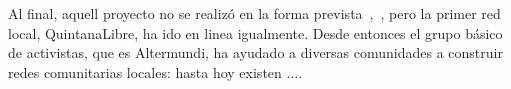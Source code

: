 \begin{comment}
2015
* talleres educativos con otros proyectos (cooperativa de mujeres en NIC?)
* Abr: LaBolsaLibre va en linea
* Dec: Macri llega al poder en Argentina --> política orientada hacia al mercado: laissez-faire capitalismo, los límites para lincencias cesan
  ** deroga el Artículo 82 de la Argentina Digital

reticulación (vernetzung)/intercambio de experiencias con otros proyectos internacionales
* Rhizomatica
* BattleMesh



2016
* principios: Macri modifica la Ley 26.522 con un decreto: " morigerar el carácter antimonopólico de la ley, beneficiando a los principales medios de comunicación del país. "
* FCC + EU: Firmware lockdown
* Nace el proyecto del Libre router
"This virtuous relation between hardware vendors and the community has been threatened by new regulation from the Federal Communitations Commision (FCC) – U.S.A. – which has led vendors to globally close up their routers to third party modifications, hindering open innovation and effectively closing the door to Community Networks in terms of access to the hardware they depend on. https://librerouter.org/what-and-why"

2017
* Julio: el decreto de Macri llega al Corte Suprema, que aun ha de pronunciarse hacia su legalidad
* Octubre: planificado el lanzamiento del libre router
pliegues de redes comunitarias en Argentina

Las redes aquí enumeradas utilizan tecnología desarrollada por AlterMundi y reciben soporte y asistencia de parte de la Asociación.

QuintanaLibre, Córdoba, iniciada en Marzo de 2012 
DeltaLibre, Buenos Aires, iniciada en Abril de 2012 
AnisacateLibre, Córdoba, iniciada en Septiembre de 2012 
LaSerranitaLibre, Córdoba, iniciada en Septiembre de 2013 
NonoLibre, Córdoba, Iniciada en Marzo de 2014 
BoquerónLibre, Santiago del Estero, Abril de 2015 
LaBolsaLibre, Córdoba, iniciada en Mayo de 2015

Despliegues de redes comunitarias en el exterior

Fumaça Online, Río de Janeiro, Brasil, Julio de 2015
MulukukuLibre, Nicaragua, Enero de 2016
Caimito Libre, Esmeraldas, Febrero de 2017
\end{comment}

Al final, aquell proyecto no se realizó en la forma prevista~\autocite{Vaseva2016a},~\autocite{iv-nico-pillku}, pero la primer red local, QuintanaLibre, ha ido en linea igualmente.
Desde entonces el grupo básico de activistas, que es Altermundi, ha ayudado a diversas comunidades a construir redes comunitarias locales:
hasta hoy existen ....

